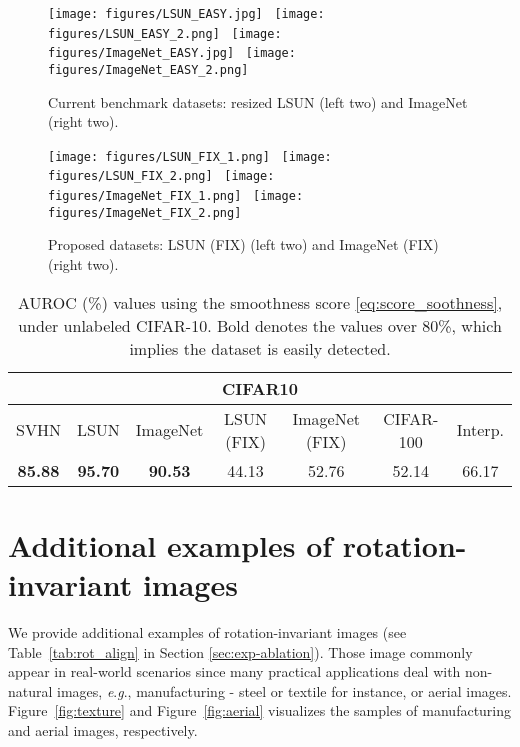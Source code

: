 \documentclass{article}
\newcommand{\eg}{\textit{e}.\textit{g}.}
\begin{document}
\begin{figure*}[h]
\centering
\texttt{[image: figures/LSUN\_EASY.jpg]}
~\texttt{[image: figures/LSUN\_EASY\_2.png]}
~\texttt{[image: figures/ImageNet\_EASY.jpg]}
~\texttt{[image: figures/ImageNet\_EASY\_2.png]}
\vspace{-0.05in}
\caption{
Current benchmark datasets: resized LSUN (left two) and ImageNet (right two).
}\label{fig:easy_ood}
\vspace{0.1in}
\centering
\texttt{[image: figures/LSUN\_FIX\_1.png]}
~\texttt{[image: figures/LSUN\_FIX\_2.png]}
~\texttt{[image: figures/ImageNet\_FIX\_1.png]}
~\texttt{[image: figures/ImageNet\_FIX\_2.png]}
\vspace{-0.05in}
\caption{
Proposed datasets: LSUN (FIX) (left two) and ImageNet (FIX) (right two).
}\label{fig:hard_ood}
\end{figure*} \begin{table}[ht]
\centering\small
\caption{AUROC (\%) values using the smoothness score \eqref{eq:score_soothness}, under unlabeled CIFAR-10. Bold denotes the values over 80\%, which implies the dataset is easily detected.
}\label{tab:easy-ood}
\begin{tabular}{ccccccc}
\toprule
\multicolumn{7}{c}{CIFAR10 } \\
\midrule
SVHN & LSUN & ImageNet & LSUN (FIX) & ImageNet (FIX) & CIFAR-100 & Interp. \\
\midrule
\textbf{85.88} & \textbf{95.70} & \textbf{90.53} & 44.13 & 52.76 & 52.14 & 66.17 \\
\bottomrule
\end{tabular}
\end{table}

 
 \section{Additional examples of rotation-invariant images}
\label{appx:texture}

We provide additional examples of rotation-invariant images (see Table~\ref{tab:rot_align} in Section \ref{sec:exp-ablation}). Those image commonly appear in real-world scenarios since many practical applications deal with non-natural images, \eg, manufacturing - steel \citep{severstal} or textile \citep{schulz1996tilda} for instance, or aerial \citep{xia2018dota} images. Figure~\ref{fig:texture} and Figure~\ref{fig:aerial} visualizes the samples of manufacturing and aerial images, respectively. 
\end{document}
